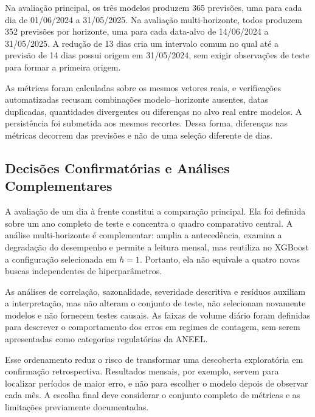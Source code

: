 Na avaliação principal, os três modelos produzem 365 previsões, uma para cada dia de 01/06/2024 a 31/05/2025. Na avaliação multi-horizonte, todos produzem 352 previsões por horizonte, uma para cada data-alvo de 14/06/2024 a 31/05/2025. A redução de 13 dias cria um intervalo comum no qual até a previsão de 14 dias possui origem em 31/05/2024, sem exigir observações de teste para formar a primeira origem.

As métricas foram calculadas sobre os mesmos vetores reais, e verificações automatizadas recusam combinações modelo--horizonte ausentes, datas duplicadas, quantidades divergentes ou diferenças no alvo real entre modelos. A persistência foi submetida aos mesmos recortes. Dessa forma, diferenças nas métricas decorrem das previsões e não de uma seleção diferente de dias.

\subsection{Decisões Confirmatórias e Análises Complementares}

A avaliação de um dia à frente constitui a comparação principal. Ela foi definida sobre um ano completo de teste e concentra o quadro comparativo central. A análise multi-horizonte é complementar: amplia a antecedência, examina a degradação do desempenho e permite a leitura mensal, mas reutiliza no XGBoost a configuração selecionada em $h=1$. Portanto, ela não equivale a quatro novas buscas independentes de hiperparâmetros.

As análises de correlação, sazonalidade, severidade descritiva e resíduos auxiliam a interpretação, mas não alteram o conjunto de teste, não selecionam novamente modelos e não fornecem testes causais. As faixas de volume diário foram definidas para descrever o comportamento dos erros em regimes de contagem, sem serem apresentadas como categorias regulatórias da ANEEL.

Esse ordenamento reduz o risco de transformar uma descoberta exploratória em confirmação retrospectiva. Resultados mensais, por exemplo, servem para localizar períodos de maior erro, e não para escolher o modelo depois de observar cada mês. A escolha final deve considerar o conjunto completo de métricas e as limitações previamente documentadas.
